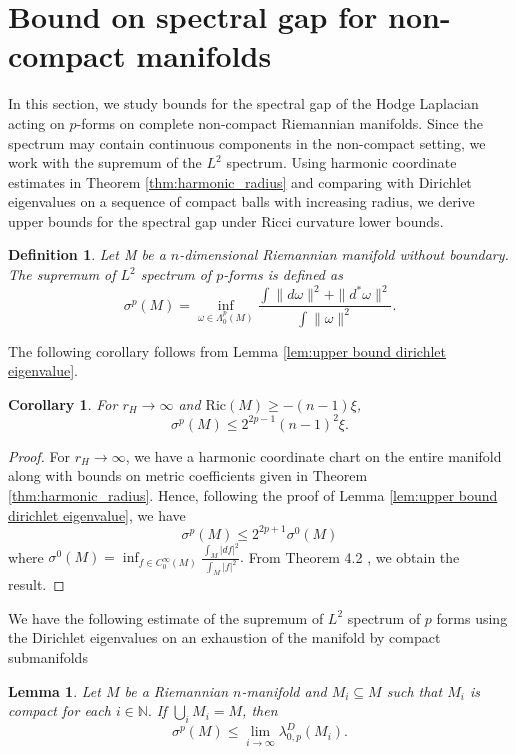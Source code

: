 \documentclass[10 pt, reqno]{amsart}
\newtheorem{lemma}[theorem]{Lemma}
\newtheorem{corollary}[theorem]{Corollary}
\newtheorem{defn}{Definition}[section]
\begin{document}
\section{Bound on spectral gap for non-compact manifolds} \label{sec:non_compact}
In this section, we study bounds for the spectral gap of the Hodge Laplacian acting on $p$-forms on complete non-compact Riemannian manifolds. Since the spectrum may contain continuous components in the non-compact setting, we work with the supremum of the $L^2$ spectrum. Using harmonic coordinate estimates in Theorem \ref{thm:harmonic_radius} and comparing with Dirichlet eigenvalues on a sequence of compact balls with increasing radius, we derive upper bounds for the spectral gap under Ricci curvature lower bounds. 
\begin{defn}
    Let M be a $n$-dimensional Riemannian manifold without boundary. The  supremum of $L^2$ spectrum of $p$-forms is defined as
    \[\sigma^p(M)=\inf_{\omega\in \Lambda^p_0(M)}\frac{\int\|d\omega\|^2+\|d^*\omega\|^2}{\int \|\omega\|^2}.\]
    
\end{defn}
The following corollary follows from Lemma \ref{lem:upper bound dirichlet eigenvalue}.
\begin{corollary} For $r_H\rightarrow \infty$ and $\mathrm{Ric}(M)\ge -(n-1)\xi$, 
    \[\sigma^p(M)\le 2^{2p-1}(n-1)^2\xi.\]
\end{corollary}
\begin{proof}
    For $r_H \rightarrow \infty$, we have a harmonic coordinate chart on the entire manifold along with bounds on metric coefficients given in Theorem \ref{thm:harmonic_radius}. Hence, following the proof of Lemma \ref{lem:upper bound dirichlet eigenvalue}, we have  \[\sigma^p(M)\le 2^{2p+1} \sigma^0(M)\]
    where $\sigma^0(M)=\inf_{f\in C_0^\infty(M)}\frac{\int_M |df|^2}{\int_M|f|^2}.$ From Theorem 4.2 \cite{Cheng}, we obtain the result.
    
    \end{proof}

We have the following estimate of the supremum of $L^2$ spectrum of $p$ forms using the Dirichlet eigenvalues on  an exhaustion of the manifold by compact submanifolds 

\begin{lemma}
\label{lem:exhausting_M_dirichlet}
 Let $M$ be a Riemannian $n$-manifold and $M_i\subseteq M$ such that $M_i$ is compact for each $i\in \mathbb{N}.$  If  $\bigcup_i M_i=M$, then
    \[\sigma^p(M)\le\lim_{i\rightarrow\infty} \lambda_{0,p}^D(M_i).\]
\end{lemma}
\end{document}
